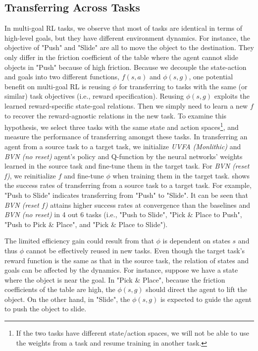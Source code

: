 \documentclass[dvipsnames]{article} %
\theoremstyle{definition}
\theoremstyle{remark}
\newcommand{\mono}{\textit{UVFA (Monlithic)}\xspace}
\begin{document}
\subsection{Transferring Across Tasks}
\label{subsec:trans}
In multi-goal RL tasks, we observe that most of tasks are identical in terms of high-level goals, but they have different environment dynamics. For instance, the objective of "Push" and "Slide" are all to move the object to the destination. They only differ in the friction coefficient of the table where the agent cannot slide objects in "Push" because of high friction. Because we decouple the state-action and goals into two different functions, $f(s,a)$ and $\phi(s,g)$, one potential benefit on multi-goal RL is reusing $\phi$ for transferring to tasks with the same (or similar) task objectives (i.e., reward specification). Reusing $\phi(s,g)$ exploits the learned reward-specific state-goal relations. Then we simply need to learn a new $f$ to recover the reward-agnostic relations in the new task. 
To examine this hypothesis, we select three tasks with the same state and action spaces\footnote{If the two tasks have different state/action spaces, we will not be able to use the weights from a task and resume training in another task.}, and measure the performance of transferring amongst these tasks. In transferring an agent from a source task to a target task, we initialize \mono and \textit{BVN (no reset)} agent's policy and Q-function by the neural networks' weights learned in the source task and fine-tune them in the target task. For \textit{BVN (reset f)}, we reinitialize $f$ and fine-tune $\phi$ when training them in the target task.  shows the success rates of transferring from a source task to a target task. For example, "Push to Slide" indicates transferring from "Push" to "Slide". It can be seen that \textit{BVN (reset $f$)} attains higher success rates at convergence than the baselines and \textit{BVN (no reset)} in 4 out 6 tasks (i.e., "Push to Slide", "Pick \& Place to Push", "Push to Pick \& Place", and "Pick \& Place to Slide").

The limited efficiency gain could result from that $\phi$ is dependent on states $s$ and thus $\phi$ cannot be effectively reused in new tasks. Even though the target task's reward function is the same as that in the source task, the relation of states and goals can be affected by the dynamics. For instance, suppose we have a state where the object is near the goal. In "Pick \& Place", because the friction coefficients of the table are high, the $\phi(s,g)$ should direct the agent to lift the object. On the other hand, in "Slide", the $\phi(s,g)$ is expected to guide the agent to push the object to slide. 
\end{document}
